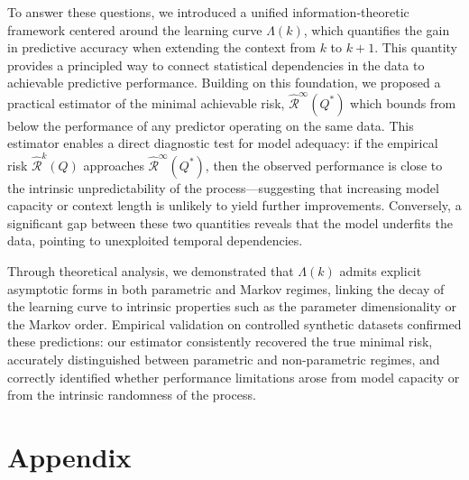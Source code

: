 \documentclass{article}
\begin{document}
To answer these questions, we introduced a unified information-theoretic framework centered around the learning curve 
$\Lambda(k)$, which quantifies the gain in predictive accuracy when extending the context from $k$ to $k+1$. 
This quantity provides a principled way to connect statistical dependencies in the data to achievable predictive performance. Building on this foundation, we proposed a practical estimator of the minimal achievable risk, $\hat{\mathcal{R}}^{\infty}(Q^{*})$ which bounds from below the performance of any predictor operating on the same data. This estimator enables a direct diagnostic test for model adequacy: if the empirical risk $\hat{\mathcal{R}}^{k}(Q)$ approaches $\hat{\mathcal{R}}^{\infty}(Q^{*})$, then the observed performance is close to the intrinsic unpredictability of the process—suggesting that increasing model capacity or context length is unlikely to yield further improvements. 
Conversely, a significant gap between these two quantities reveals that the model underfits the data, pointing to unexploited temporal dependencies.

Through theoretical analysis, we demonstrated that $\Lambda(k)$ admits explicit asymptotic forms in both parametric and Markov regimes, linking the decay of the learning curve to intrinsic properties such as the parameter dimensionality or the Markov order. 
Empirical validation on controlled synthetic datasets confirmed these predictions: our estimator consistently recovered the true minimal risk, accurately distinguished between parametric and non-parametric regimes, and correctly identified whether performance limitations arose from model capacity or from the intrinsic randomness of the process.


\newpage

  



\newpage

\appendix
\section*{Appendix}
\end{document}
